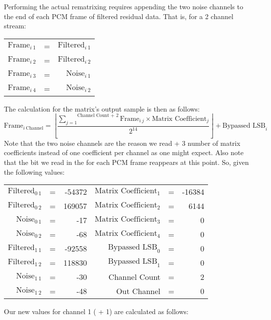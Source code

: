 Performing the actual rematrixing requires appending the two
noise channels to the end of each PCM frame of filtered residual data.
That is, for a 2 channel stream:
\par
\noindent
\begin{tabular}{r c r}
$\text{Frame}_{i~1}$ & = & $\text{Filtered}_{i~1}$ \\
$\text{Frame}_{i~2}$ & = & $\text{Filtered}_{i~2}$ \\
$\text{Frame}_{i~3}$ & = & $\text{Noise}_{i~1}$ \\
$\text{Frame}_{i~4}$ & = & $\text{Noise}_{i~2}$
\end{tabular}
\par
\noindent
The calculation for the matrix's output sample is then as follows:
\begin{equation*}
\text{Frame}_{i~\text{Channel}} = \left\lfloor\frac{\overset{\text{Channel Count + 2}}{\underset{j = 1}{\sum}}{\text{Frame}_{i~j} \times \text{Matrix Coefficient}_j}}{2 ^ {14}}\right\rfloor + \text{Bypassed LSB}_i
\end{equation*}
Note that the two noise channels are the reason we read
 + 3 number of matrix coefficients
instead of one coefficient per channel as one might expect.
Also note that the  bit we read in the
 for each PCM frame reappears at this point.
So, given the following values:
\par
\noindent
\begin{tabular}{r c r r c r}
$\text{Filtered}_{0~1}$ & = & -54372 &
$\text{Matrix Coefficient}_1$ & = & -16384 \\
$\text{Filtered}_{0~2}$ & = & 169057 &
$\text{Matrix Coefficient}_2$ & = & 6144 \\
$\text{Noise}_{0~1}$ & = & -17 &
$\text{Matrix Coefficient}_3$ & = & 0 \\
$\text{Noise}_{0~2}$ & = & -68 &
$\text{Matrix Coefficient}_4$ & = & 0 \\
$\text{Filtered}_{1~1}$ & = & -92558 &
$\text{Bypassed LSB}_0$ & = & 0 \\
$\text{Filtered}_{1~2}$ & = & 118830 &
$\text{Bypassed LSB}_1$ & = & 0 \\
$\text{Noise}_{1~1}$ & = & -30 &
Channel Count & = & 2 \\
$\text{Noise}_{1~2}$ & = & -48 &
Out Channel & = & 0
\end{tabular}
\par
\noindent
Our new values for channel 1 ( + 1) are calculated as follows:
